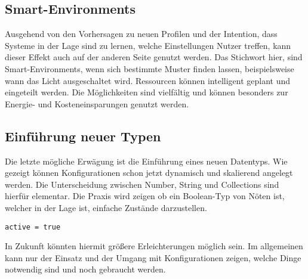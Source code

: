 \subsection{Smart-Environments}
Ausgehend von den Vorhersagen zu neuen Profilen und der Intention, dass Systeme in der Lage sind zu lernen, welche Einstellungen Nutzer treffen, kann dieser Effekt auch auf der anderen Seite genutzt werden. Das Stichwort hier, sind Smart-Environments, wenn sich bestimmte Muster finden lassen, beispielsweise wann das Licht ausgeschaltet wird. Ressourcen können intelligent geplant und eingeteilt werden. Die Möglichkeiten sind vielfältig und können besonders zur Energie- und Kosteneinsparungen genutzt werden.

\subsection{Einführung neuer Typen}
Die letzte mögliche Erwägung ist die Einführung eines neuen Datentyps. Wie gezeigt können Konfigurationen schon jetzt dynamisch und skalierend angelegt werden. Die Unterscheidung zwischen Number, String und Collections sind hierfür elementar. Die Praxis wird zeigen ob ein Boolean-Typ von Nöten ist, welcher in der Lage ist, einfache Zustände darzustellen.
\lstset{language=bash}
\begin{lstlisting}[caption=Möglicher Boolean-Typ, captionpos=b]
	active = true
\end{lstlisting}

In Zukunft könnten hiermit größere Erleichterungen möglich sein. Im allgemeinen kann nur der Einsatz und der Umgang mit Konfigurationen zeigen, welche Dinge notwendig sind und noch gebraucht werden. 



